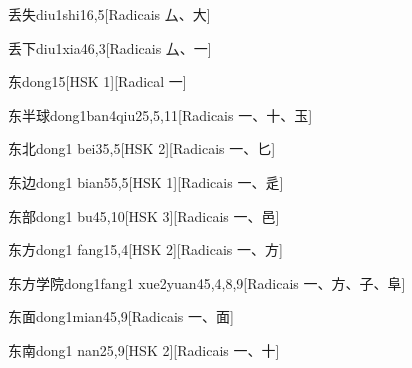 \begin{entry}{丢失}{diu1shi1}{6,5}[Radicais ⼛、⼤]
\end{entry}

\begin{entry}{丢下}{diu1xia4}{6,3}[Radicais ⼛、⼀]
\end{entry}

\begin{entry}{东}{dong1}{5}[HSK 1][Radical ⼀]
\end{entry}

\begin{entry}{东半球}{dong1ban4qiu2}{5,5,11}[Radicais ⼀、⼗、⽟]
\end{entry}

\begin{entry}{东北}{dong1 bei3}{5,5}[HSK 2][Radicais ⼀、⼔]
\end{entry}

\begin{entry}{东边}{dong1 bian5}{5,5}[HSK 1][Radicais ⼀、⾡]
\end{entry}

\begin{entry}{东部}{dong1 bu4}{5,10}[HSK 3][Radicais ⼀、⾢]
\end{entry}

\begin{entry}{东方}{dong1 fang1}{5,4}[HSK 2][Radicais ⼀、⽅]
\end{entry}

\begin{entry}{东方学院}{dong1fang1 xue2yuan4}{5,4,8,9}[Radicais ⼀、⽅、⼦、⾩]
\end{entry}

\begin{entry}{东面}{dong1mian4}{5,9}[Radicais ⼀、⾯]
\end{entry}

\begin{entry}{东南}{dong1 nan2}{5,9}[HSK 2][Radicais ⼀、⼗]
\end{entry}

